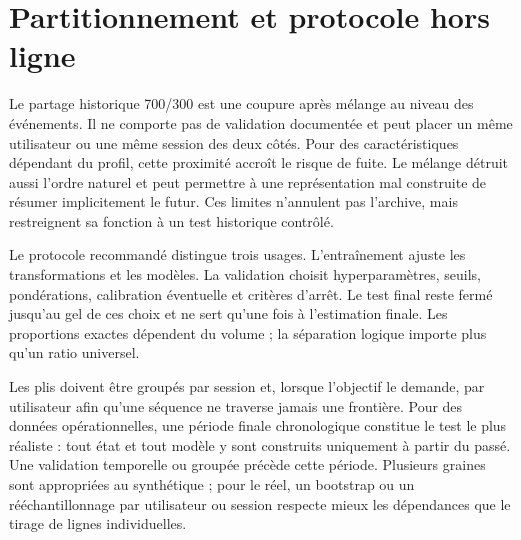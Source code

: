 \documentclass[11pt,a4paper,oneside]{report}
\theoremstyle{definition}
\theoremstyle{plain}
\begin{document}
\section{Partitionnement et protocole hors ligne}

Le partage historique 700/300 est une coupure après mélange au niveau des
événements. Il ne comporte pas de validation documentée et peut placer un même
utilisateur ou une même session des deux côtés. Pour des caractéristiques
dépendant du profil, cette proximité accroît le risque de fuite. Le mélange
détruit aussi l'ordre naturel et peut permettre à une représentation mal
construite de résumer implicitement le futur. Ces limites n'annulent pas
l'archive, mais restreignent sa fonction à un test historique contrôlé.

Le protocole recommandé distingue trois usages. L'entraînement ajuste les
transformations et les modèles. La validation choisit hyperparamètres, seuils,
pondérations, calibration éventuelle et critères d'arrêt. Le test final reste
fermé jusqu'au gel de ces choix et ne sert qu'une fois à l'estimation finale.
Les proportions exactes dépendent du volume ; la séparation logique importe
plus qu'un ratio universel.

Les plis doivent être groupés par session et, lorsque l'objectif le demande,
par utilisateur afin qu'une séquence ne traverse jamais une frontière. Pour des
données opérationnelles, une période finale chronologique constitue le test le
plus réaliste : tout état et tout modèle y sont construits uniquement à partir
du passé. Une validation temporelle ou groupée précède cette période. Plusieurs
graines sont appropriées au synthétique ; pour le réel, un bootstrap ou un
rééchantillonnage par utilisateur ou session respecte mieux les dépendances que
le tirage de lignes individuelles.
\end{document}
